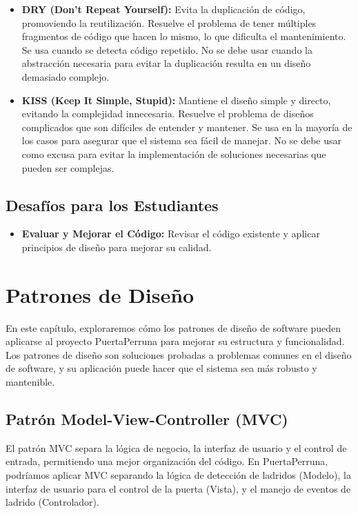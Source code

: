 \begin{itemize}
\begin{itemize}
        \end{itemize}
    \item \textbf{DRY (Don't Repeat Yourself):} Evita la duplicación de código, promoviendo la reutilización. Resuelve el problema de tener múltiples fragmentos de código que hacen lo mismo, lo que dificulta el mantenimiento. Se usa cuando se detecta código repetido. No se debe usar cuando la abstracción necesaria para evitar la duplicación resulta en un diseño demasiado complejo.
    \item \textbf{KISS (Keep It Simple, Stupid):} Mantiene el diseño simple y directo, evitando la complejidad innecesaria. Resuelve el problema de diseños complicados que son difíciles de entender y mantener. Se usa en la mayoría de los casos para asegurar que el sistema sea fácil de manejar. No se debe usar como excusa para evitar la implementación de soluciones necesarias que pueden ser complejas.
\end{itemize}

\subsection{Desafíos para los Estudiantes}

\begin{itemize}
    \item \textbf{Evaluar y Mejorar el Código:} Revisar el código existente y aplicar principios de diseño para mejorar su calidad.
\end{itemize}

\section{Patrones de Diseño}

En este capítulo, exploraremos cómo los patrones de diseño de software pueden aplicarse al proyecto PuertaPerruna para mejorar su estructura y funcionalidad. Los patrones de diseño son soluciones probadas a problemas comunes en el diseño de software, y su aplicación puede hacer que el sistema sea más robusto y mantenible.

\subsection{Patrón Model-View-Controller (MVC)}

El patrón MVC separa la lógica de negocio, la interfaz de usuario y el control de entrada, permitiendo una mejor organización del código. En PuertaPerruna, podríamos aplicar MVC separando la lógica de detección de ladridos (Modelo), la interfaz de usuario para el control de la puerta (Vista), y el manejo de eventos de ladrido (Controlador).

